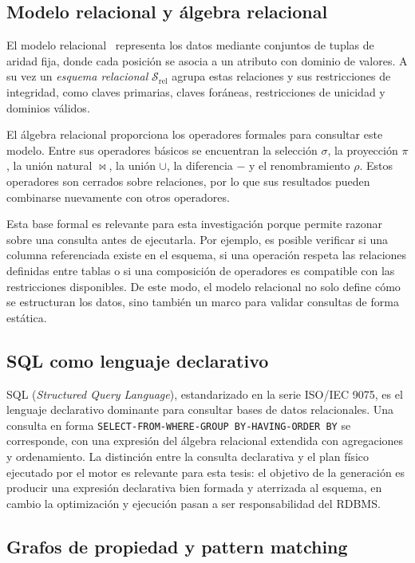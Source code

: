 \subsection{Modelo relacional y álgebra relacional}

El modelo relacional~\cite{Codd1970Relational} representa los datos mediante conjuntos de tuplas de aridad fija, donde cada posición se asocia a un atributo con dominio de valores. A su vez un \emph{esquema relacional} $\mathcal{S}_{\mathrm{rel}}$ agrupa estas relaciones y sus restricciones de integridad, como claves primarias, claves foráneas, restricciones de unicidad y dominios válidos.

El álgebra relacional proporciona los operadores formales para consultar este modelo. Entre sus operadores básicos se encuentran la selección $\sigma$, la proyección $\pi$, la unión natural $\bowtie$, la unión $\cup$, la diferencia $-$ y el renombramiento $\rho$. Estos operadores son cerrados sobre relaciones, por lo que sus resultados pueden combinarse nuevamente con otros operadores.

Esta base formal es relevante para esta investigación porque permite razonar sobre una consulta antes de ejecutarla. Por ejemplo, es posible verificar si una columna referenciada existe en el esquema, si una operación respeta las relaciones definidas entre tablas o si una composición de operadores es compatible con las restricciones disponibles. De este modo, el modelo relacional no solo define cómo se estructuran los datos, sino también un marco para validar consultas de forma estática.

\subsection{SQL como lenguaje declarativo}

SQL (\emph{Structured Query Language}), estandarizado en la serie ISO/IEC 9075, es el lenguaje declarativo dominante para consultar bases de datos relacionales. Una consulta en forma \texttt{SELECT-FROM-WHERE-GROUP BY-HAVING-ORDER BY} se corresponde, con una expresión del álgebra relacional extendida con agregaciones y ordenamiento. La distinción entre la consulta declarativa y el plan físico ejecutado por el motor es relevante para esta tesis: el objetivo de la generación es producir una expresión declarativa bien formada y aterrizada al esquema, en cambio la optimización y ejecución pasan a ser responsabilidad del \ac{RDBMS}.

\subsection{Grafos de propiedad y pattern matching}

